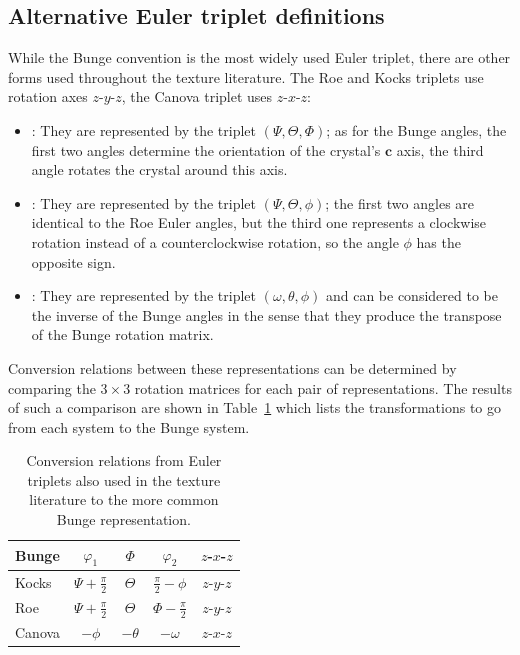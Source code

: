 \subsection{Alternative Euler triplet definitions}\label{\chabbr:sec:Eulteralternatives}
While the Bunge convention is the most widely used Euler triplet, there are other forms used throughout the texture literature. The Roe and Kocks triplets use rotation axes $z$-$y$-$z$, the Canova triplet uses $z$-$x$-$z$:
\begin{itemize}
\item {}: They are represented by the triplet $(\Psi, \Theta, \Phi)$; as for the Bunge angles, the first two angles determine the orientation of the crystal's $\mathbf{c}$ axis, the third angle rotates the crystal around this axis.
\item {}: They are represented by the triplet $(\Psi, \Theta, \phi)$; the first two angles are identical to the Roe Euler angles, but the third one represents a clockwise rotation instead of a counterclockwise rotation, so the angle $\phi$ has the opposite sign.
\item {}: They are represented by the triplet $(\omega,\theta,\phi)$ and can be considered to be the inverse of the Bunge angles in the sense that they produce the transpose of the Bunge rotation matrix.
\end{itemize}
Conversion relations between these representations can be determined by comparing the $3\times 3$ rotation matrices for each pair of representations. The results of such a comparison are shown in Table~\ref{\chabbr:tb:Eulerconversions} which lists the transformations to go from each system to the Bunge system.

\begin{table}[h]
\centering\leavevmode
\begin{tabular}{|l|cccc|}
\hline
Bunge & $\varphi_1$ & $\Phi$ & $\varphi_2$ &  $z$-$x$-$z$ \\
\hline
Kocks & $\Psi+\frac{\pi}{2}$ & $\Theta$ & $\frac{\pi}{2}-\phi$ & $z$-$y$-$z$\\
Roe    & $\Psi+\frac{\pi}{2}$ & $\Theta$ & $\Phi-\frac{\pi}{2}$ & $z$-$y$-$z$\\
Canova & $-\phi$& $-\theta$ & $-\omega$ & $z$-$x$-$z$\\
\hline
\end{tabular}
\caption{\label{\chabbr:tb:Eulerconversions}Conversion relations from Euler triplets also used in the texture literature to the more common Bunge representation.}
\end{table}





